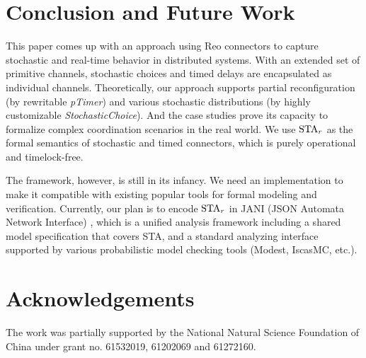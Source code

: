\section{Conclusion and Future Work}
\label{sec:conclusion}

This paper comes up with an approach using Reo connectors to capture stochastic and real-time behavior in distributed systems. With an extended set of primitive channels, stochastic choices and timed delays are encapsulated as individual channels. Theoretically, our approach supports partial reconfiguration (by rewritable \emph{pTimer}) and various stochastic distributions (by highly customizable \emph{StochasticChoice}). And the case studies prove its capacity to formalize complex coordination scenarios in the real world. We use $\mbox{STA}_r$ as the formal semantics of stochastic and timed connectors, which is purely operational and timelock-free.

The framework, however, is still in its infancy. We need an implementation to make it compatible with existing popular tools for formal modeling and verification. Currently, our plan is to encode $\mbox{STA}_r$ in JANI (JSON Automata Network Interface) \cite{JaniSpec}, which is a unified analysis framework including a shared model specification that covers STA, and a standard analyzing interface supported by various probabilistic model checking tools (Modest\cite{Hartmanns12}, IscasMC\cite{HahnYiFM14}, etc.).


\section*{Acknowledgements}
The work was partially supported by the National Natural Science Foundation of China under grant no. 61532019, 61202069 and 61272160.